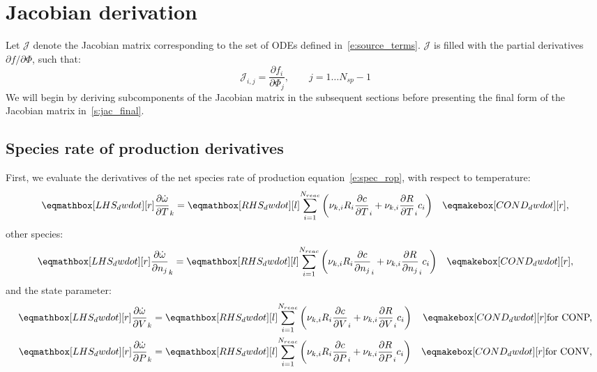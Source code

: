 \documentclass[12pt]{article}
\newcommand{\ns}{N_{sp}}
\newcommand{\nr}{N_{reac}}
\newcommand{\conp}{CONP}
\newcommand{\conv}{CONV}
\newcommand{\dconp}{\ifmmode\text{for \conp,}\else for \conp,\fi}
\newcommand{\dconv}{\ifmmode\text{for \conv,}\else for \conv,\fi}
\begin{document}
\section{Jacobian derivation}

Let $\mathcal{J}$ denote the Jacobian matrix corresponding to the set of ODEs defined in~\cref{e:source_terms}.
$\mathcal{J}$ is filled with the partial derivatives $\partial f / \partial \Phi$, such that:
\begin{equation}
 \mathcal{J}_{i,j} = \frac{\partial f_i}{\partial \Phi_j},\qquad j=1 \ldots \ns - 1
\end{equation}
We will begin by deriving subcomponents of the Jacobian matrix in the subsequent sections before presenting the final form of the Jacobian matrix in~\cref{s:jac_final}.

\subsection{Species rate of production derivatives}
First, we evaluate the derivatives of the net species rate of production equation~\cref{e:spec_rop}, with respect to temperature:
\begin{align}
 \label{e:dwdot_dT}
 \lhs{dwdot}{\frac{\partial \dot{\omega} }{\partial T }_{k}} &= \rhs{dwdot}{\sum_{i=1}^{\nr} \left(\nu_{k,i} R_{i} \frac{\partial c }{\partial T }_{i} + \nu_{k,i} \frac{\partial R }{\partial T }_{i} c_{i}\right)} & \cond{dwdot}{,}
\end{align}
other species:
\begin{align}
 \label{e:dwdot_dnj}
 \lhs{dwdot}{\frac{\partial \dot{\omega} }{\partial {n_j} }_{k}} &= \rhs{dwdot}{\sum_{i=1}^{\nr} \left(\nu_{k,i} R_{i} \frac{\partial c }{\partial {n_j} }_{i} + \nu_{k,i} \frac{\partial R }{\partial {n_j} }_{i} c_{i}\right)} & \cond{dwdot}{,}
\end{align}
and the state parameter:
\begin{subequations}
 \label{e:dwdot_de}
 \begin{align}
  \lhs{dwdot}{\frac{\partial \dot{\omega} }{\partial V }_{k}} &= \rhs{dwdot}{\sum_{i=1}^{\nr} \left(\nu_{k,i} R_{i} \frac{\partial c }{\partial V }_{i} + \nu_{k,i} \frac{\partial R }{\partial V }_{i} c_{i}\right)} & \cond{dwdot}{\dconp}\\
  \lhs{dwdot}{\frac{\partial \dot{\omega} }{\partial P }_{k}} &= \rhs{dwdot}{\sum_{i=1}^{\nr} \left(\nu_{k,i} R_{i} \frac{\partial c }{\partial P }_{i} + \nu_{k,i} \frac{\partial R }{\partial P }_{i} c_{i}\right)} & \cond{dwdot}{\dconv}
 \end{align}
\end{subequations}
\end{document}
